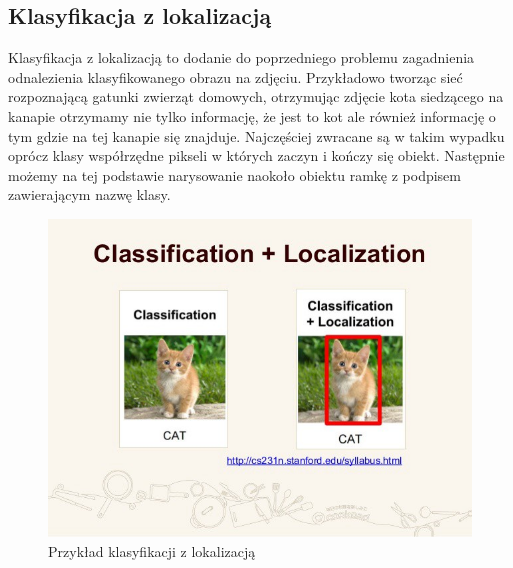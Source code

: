 \documentclass{article}
\begin{document}
\subsection{Klasyfikacja z lokalizacją}
Klasyfikacja z lokalizacją to dodanie do poprzedniego problemu zagadnienia odnalezienia klasyfikowanego obrazu na zdjęciu.
Przykładowo tworząc sieć rozpoznającą gatunki zwierząt domowych, otrzymując zdjęcie kota siedzącego na kanapie otrzymamy nie tylko informację,
że jest to kot ale również informację o tym gdzie na tej kanapie się znajduje.
Najczęściej zwracane są w takim wypadku oprócz klasy współrzędne pikseli w których zaczyn i kończy się obiekt.
Następnie możemy na tej podstawie narysowanie naokoło obiektu ramkę z podpisem zawierającym nazwę klasy.
\begin{figure}[h!]
  \centering
  \includegraphics[width=\linewidth]{images/klasyfikacja_z_lokalizacja.jpeg}
  \caption{Przykład klasyfikacji z lokalizacją}
  \label{fig:klasyfikacja_z_lokalizacja}
\end{figure}
\end{document}

